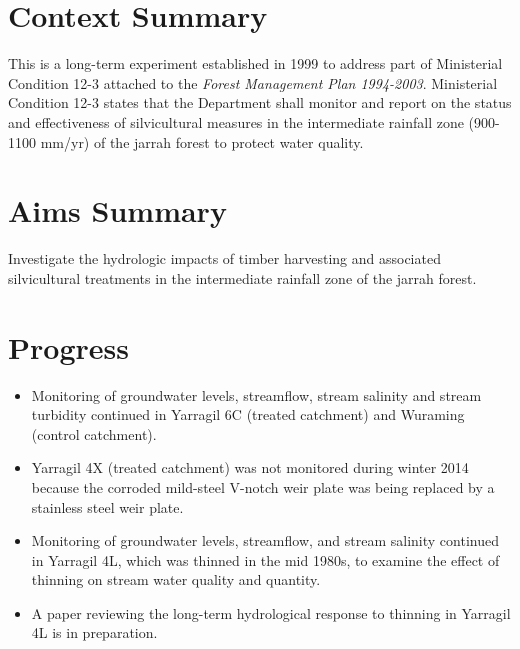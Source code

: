 \documentclass[version=last, paper=a4, DIV=18, usenames, dvipsnames]{scrartcl}
\begin{document}
%

%




\section*{Context Summary}
This is a long-term experiment established in 1999 to address part of
Ministerial Condition 12-3 attached to the \emph{Forest Management Plan
1994-2003}. Ministerial Condition 12-3 states that the Department shall
monitor and report on the status and effectiveness of silvicultural
measures in the intermediate rainfall zone (900-1100 mm/yr) of the
jarrah forest to protect water quality.



\section*{Aims Summary}
Investigate the hydrologic impacts of timber harvesting and associated
silvicultural treatments in the intermediate rainfall zone of the jarrah
forest.



\section*{Progress}
\begin{itemize}
\itemsep1pt\parskip0pt
\item
  Monitoring of groundwater levels, streamflow, stream salinity and
  stream turbidity continued in Yarragil 6C (treated catchment) and
  Wuraming (control catchment).
\item
  Yarragil 4X (treated catchment) was not monitored during winter 2014
  because the corroded mild-steel V-notch weir plate was being replaced
  by a stainless steel weir plate.~
\item
  Monitoring of groundwater levels, streamflow, and stream salinity
  continued in Yarragil 4L, which was thinned in the mid 1980s, to
  examine the effect of thinning on stream water quality and quantity.
\item
  A paper reviewing the long-term hydrological response to thinning in
  Yarragil 4L is in preparation.
\end{itemize}
\end{document}
